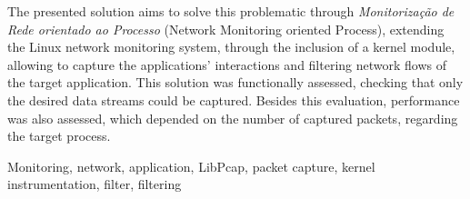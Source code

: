 The presented solution aims to solve this problematic through \textit{Monitorização de Rede orientado ao Processo} (Network Monitoring oriented Process), extending the Linux network monitoring system, through the inclusion of a kernel module, allowing to capture the applications’ interactions and filtering network flows of the target application.
This solution was functionally assessed, checking that only the desired data streams could be captured.
Besides this evaluation, performance was also assessed, which depended on the number of captured packets, regarding the target process. 



\begin{keywords}
Monitoring, network, application, LibPcap, packet capture, kernel instrumentation, filter, filtering
\end{keywords} 
